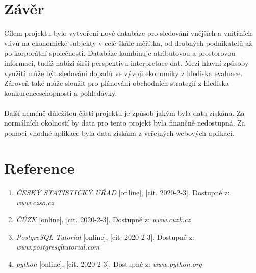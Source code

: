 \documentclass[a4paper, 12pt]{article}
\begin{document}
\section{Závěr}
Cílem projektu bylo vytvoření nové databáze pro sledování vnějších a vnitřních vlivů na ekonomické subjekty v celé škále měřítka, od drobných podnikatelů až po korporátní společnosti. Databáze kombinuje atributovou a prostorovou informaci, tudíž nabízí širší perspektivu interpretace dat. Mezi hlavní způsoby využití může být sledování dopadů ve vývoji ekonomiky z hlediska evaluace. Zároveň také může sloužit pro plánování obchodních strategií z hlediska konkurenceschopnosti a pohledávky.\\
\\
Další neméně důležitou částí projektu je způsob jakým byla data získána. Za normálních okolností by data pro tento projekt byla finančně nedostupná. Za pomoci vhodné aplikace byla data získána z veřejných webových aplikací. 

\section{Reference}

\begin{enumerate}

\item \textit{ČESKÝ STATISTICKÝ ÚŘAD} [online], [cit. 2020-2-3]. Dostupné z: \textit{www.czso.cz}

\item \textit{ČÚZK} [online], [cit. 2020-2-3]. Dostupné z: \textit{www.cuzk.cz}

\item \textit{PostgreSQL Tutorial} [online], [cit. 2020-2-3]. Dostupné z: \textit{www.postgresqltutorial.com}

\item \textit{python} [online], [cit. 2020-2-3]. Dostupné z: \textit{www.python.org}

\end{enumerate}
\end{document}
